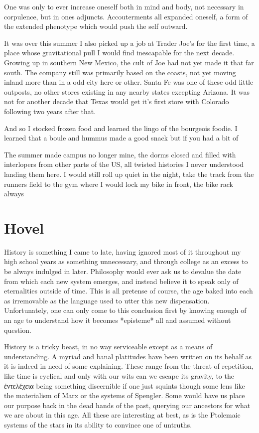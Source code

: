 \documentclass[ebook, 10pt, openright, onecolumn]{memoir}
\newcommand{\textgreek}[1]{\begingroup\fontencoding{LGR}\selectfont#1\endgroup}
\newcommand*\td[1]{
  \todo[inline]{
     #1 
  }
}
\newcommand*\finish{\td{ ----- Finish this section -----}}
\begin{document}
One was only to ever increase oneself both in mind and body, not
necessary in corpulence, but in ones adjuncts.  Accouterments all expanded
oneself, a form of the extended phenotype which would push the self outward.


It was over this summer I also picked up a job at Trader Joe's for the first
time, a place whose gravitational pull I would find inescapable for the next
decade.  Growing up in southern New Mexico, the cult of Joe had not yet made it
that far south.  The company still was primarily based on the coasts, not yet
moving inland more than in a odd city here or other. Santa Fe was one of these
odd little outposts, no other stores existing in any nearby states excepting
Arizona.  It was not for another decade that Texas  would get it's first
store with Colorado following two years after that.

\finish

And so I stocked frozen food and learned the lingo of the bourgeois foodie. I
learned that a boule and hummus made a good snack but if you had a bit of


The summer made campus no longer mine, the dorms closed and filled with
interlopers from other parts of the US, all twisted histories I never understood
landing them here.  I would still roll up quiet in the night, take the track
from the runners field to the gym where I would lock my bike in front, the bike
rack always

\chapter{Hovel}
\label{cha:hovel}

History is something I came to late, having ignored most of it throughout my
high school years as something unnecessary, and through college as an excess to
be always indulged in later.  Philosophy would ever ask us to devalue the date
from which each new system emerges, and instead believe it to speak only of
eternalities outside of time.  This is all pretense of course, the age baked
into each as irremovable as the language used to utter this new dispensation.
Unfortunately, one can only come to this conclusion first by knowing enough of
an age to understand how it becomes *episteme* all and assumed without
question.


History is a tricky beast, in no way serviceable except as a means of
understanding.  A myriad and banal platitudes have been written on its behalf as
it is indeed in need of some explaining.  These range from the threat of
repetition, like time is cyclical and only with our wits can we escape its
gravity, to the \textgreek{ἐντελέχεια} being something discernible if one just squints
though some lens like the materialism of Marx or the systems of Spengler. Some
would have us place our purpose back in the dead hands of the past, querying our
ancestors for what we are about in this age.  All these are interesting at best,
as is the Ptolemaic systems of the stars in its ability to convince one of
untruths.
\end{document}
